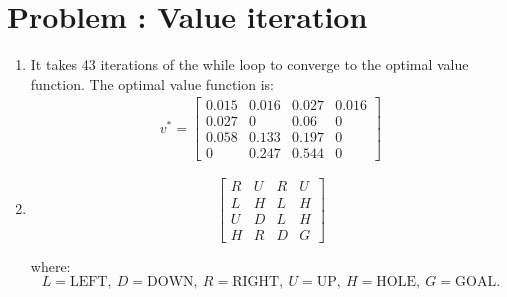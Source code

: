 \documentclass[12pt]{scrartcl}
\newcounter{exnum}
\newcommand{\exercise}[1]{\section*{Problem \theexnum\stepcounter{exnum}: #1}}
\begin{document}
\exercise{Value iteration}
\begin{enumerate}
      \item It takes 43 iterations of the while loop to converge to the optimal value function. The optimal value function is:
            \begin{align*}
                  v^* = \begin{bmatrix}
                        0.015 & 0.016 & 0.027 & 0.016 \\
                        0.027 & 0     & 0.06  & 0     \\
                        0.058 & 0.133 & 0.197 & 0     \\
                        0     & 0.247 & 0.544 & 0
                  \end{bmatrix}
            \end{align*}
      \item \[
\begin{bmatrix}
R & U & R & U \\
L & H & L & H \\
U & D & L & H \\
H & R & D & G
\end{bmatrix}
\]

where:
\[
L=\text{LEFT},\:
D=\text{DOWN},\:
R=\text{RIGHT},\:
U=\text{UP},\:
H=\text{HOLE},\:
G=\text{GOAL}.
\]     
\end{enumerate}
\end{document}
